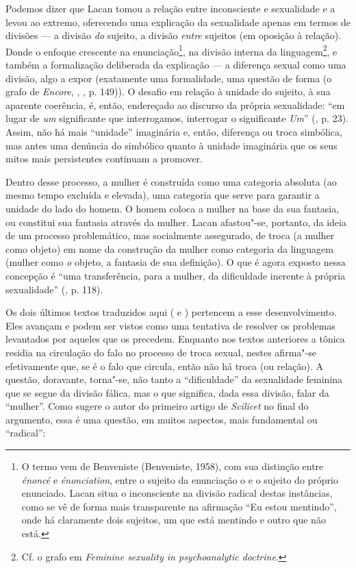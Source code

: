Podemos dizer que Lacan tomou a relação entre inconsciente e sexualidade
e a levou ao extremo, oferecendo uma explicação da sexualidade apenas em
termos de divisões --- a divisão \emph{do} sujeito, a divisão
\emph{entre} sujeitos (em oposição à relação). Donde o enfoque crescente
na enunciação\footnote{O termo vem de Benveniste (Benveniste, 1958), com
  sua distinção entre \emph{énoncé} e \emph{énonciation}, entre o
  sujeito da enunciação o e o sujeito do próprio enunciado. Lacan situa
  o inconsciente na divisão radical destas instâncias, como se vê de
  forma mais transparente na afirmação ``Eu estou mentindo'', onde há
  claramente dois sujeitos, um que está mentindo e outro que não está.},
na divisão interna da linguagem\footnote{Cf. o grafo em \emph{Feminine
  sexuality in psychoanalytic doctrine}.}, e também a formalização
deliberada da explicação --- a diferença sexual como uma divisão, algo a
expor (exatamente uma formalidade, uma questão de forma (o grafo de
\emph{Encore}, , , p. 149)). O desafio em relação à unidade
do sujeito, à sua aparente coerência, é, então, endereçado ao discurso
da própria sexualidade: ``em lugar de \emph{um} significante que
interrogamos, interrogar o significante \emph{Um}'' (, p. 23). Assim,
não há mais ``unidade'' imaginária e, então, diferença ou troca
simbólica, mas antes uma denúncia do simbólico quanto à unidade
imaginária que os seus mitos mais persistentes continuam a promover.

Dentro desse processo, a mulher é construída como uma categoria absoluta
(ao mesmo tempo excluída e elevada), uma categoria que serve para
garantir a unidade do lado do homem. O homem coloca a mulher na base da
sua fantasia, ou constitui sua fantasia através da mulher. Lacan
afastou"-se, portanto, da ideia de um processo problemático, mas
socialmente assegurado, de troca (a mulher como objeto) em nome da
construção da mulher como categoria da linguagem (mulher como \emph{o}
objeto, a fantasia de sua definição). O que é agora exposto nessa
concepção é ``uma transferência, para a mulher, da dificuldade inerente
à própria sexualidade'' (, p. 118).

Os dois últimos textos traduzidos aqui ( e ) pertencem a esse
desenvolvimento. Eles avançam e podem ser vistos como uma tentativa de
resolver os problemas levantados por aqueles que os precedem. Enquanto
nos textos anteriores a tônica residia na circulação do falo no processo
de troca sexual, nestes afirma"-se efetivamente que, se é o falo que
circula, então não há troca (ou relação). A questão, doravante,
torna"-se, não tanto a ``dificuldade'' da sexualidade feminina que se
segue da divisão fálica, mas o que significa, dada essa divisão, falar
da ``mulher''. Como sugere o autor do primeiro artigo de \emph{Scilicet}
no final do argumento, essa é uma questão, em muitos aspectos, mais
fundamental ou ``radical'':

